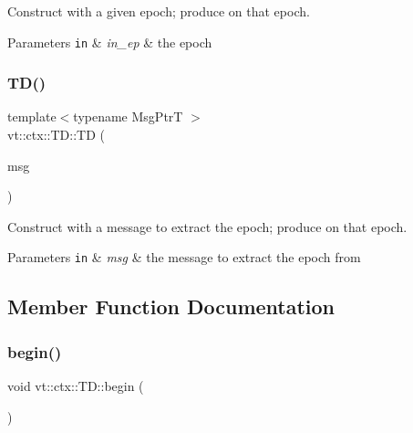 Construct with a given epoch; produce on that epoch. 


\begin{DoxyParams}[1]{Parameters}
\mbox{\tt in}  & {\em in\+\_\+ep} & the epoch \\
\hline
\end{DoxyParams}
\mbox{\label{structvt_1_1ctx_1_1_t_d_a632c366417b95a168c345cfb17051eeb}} 
\subsubsection{\texorpdfstring{T\+D()}{TD()}\hspace{0.1cm}{\footnotesize\ttfamily [3/3]}}
{\footnotesize\ttfamily template$<$typename Msg\+PtrT $>$ \\
vt\+::ctx\+::\+T\+D\+::\+TD (\begin{DoxyParamCaption}\item[{Msg\+PtrT const \&}]{msg }\end{DoxyParamCaption})\hspace{0.3cm}{\ttfamily [explicit]}}



Construct with a message to extract the epoch; produce on that epoch. 


\begin{DoxyParams}[1]{Parameters}
\mbox{\tt in}  & {\em msg} & the message to extract the epoch from \\
\hline
\end{DoxyParams}


\subsection{Member Function Documentation}
\mbox{\label{structvt_1_1ctx_1_1_t_d_a1560e74cce475bbc650f03b91bf6274e}} 
\subsubsection{\texorpdfstring{begin()}{begin()}}
{\footnotesize\ttfamily void vt\+::ctx\+::\+T\+D\+::begin (\begin{DoxyParamCaption}{ }\end{DoxyParamCaption})}



